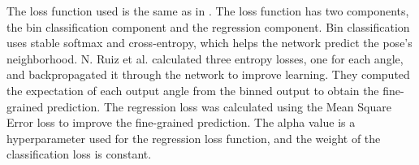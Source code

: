 The loss function used is the same as in \cite{DBLP:journals/corr/abs-1710-00925}. The loss function has two components, the bin classification component and the regression component. Bin classification uses stable softmax and cross-entropy, which helps the network predict the pose's neighborhood. N. Ruiz et al. \cite{DBLP:journals/corr/abs-1710-00925} calculated three entropy losses, one for each angle, and backpropagated it through the network to improve learning. They computed the expectation of each output angle from the binned output to obtain the fine-grained prediction. The regression loss was calculated using the Mean Square Error loss to improve the fine-grained prediction. The alpha value is a hyperparameter used for the regression loss function, and the weight of the classification loss is constant.
